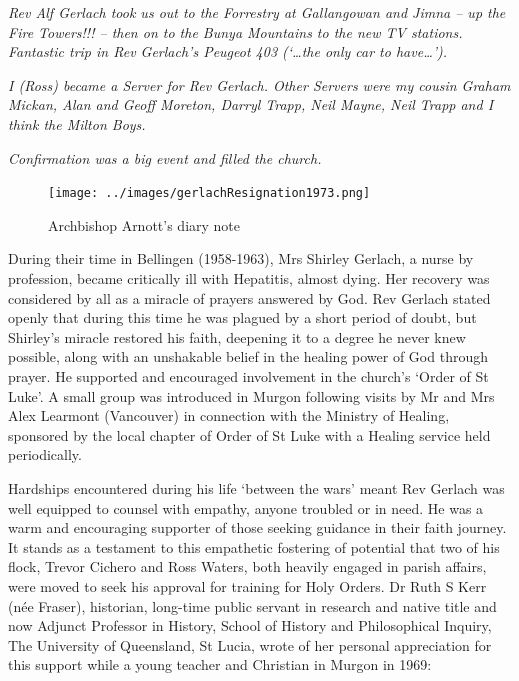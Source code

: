 \smallskip


\emph{Rev Alf Gerlach took us out to the Forrestry at Gallangowan and Jimna -- up the Fire Towers!!! -- then on to the Bunya Mountains to the new TV stations. Fantastic trip in Rev Gerlach's Peugeot 403 (`\ldots the only car to have\ldots').}



\smallskip


\emph{I (Ross) became a Server for Rev Gerlach. Other Servers were my cousin Graham Mickan, Alan and Geoff Moreton, Darryl Trapp, Neil Mayne, Neil Trapp and I think the Milton Boys.}



\smallskip


\emph{Confirmation was a big event and filled the church.}



\medskip








\begin{figure}[!htb]
\begin{center}
\texttt{[image: ../images/gerlachResignation1973.png]}
\caption{Archbishop Arnott's diary note}
\end{center}
\end{figure}




During their time in Bellingen (1958-1963), Mrs Shirley Gerlach, a nurse by profession, became critically ill with Hepatitis, almost dying. Her recovery was considered by all as a miracle of prayers answered by God. Rev Gerlach stated openly that during this time he was plagued by a short period of doubt, but Shirley's miracle restored his faith, deepening it to a degree he never knew possible, along with an unshakable belief in the healing power of God through prayer. He supported and encouraged involvement in the church's `Order of St Luke'. A small group was introduced in Murgon following visits by Mr and Mrs Alex Learmont (Vancouver) in connection with the Ministry of Healing, sponsored by the local chapter of Order of St Luke with a Healing service held periodically.



Hardships encountered during his life `between the wars' meant Rev Gerlach was well equipped to counsel with empathy, anyone troubled or in need. He was a warm and encouraging supporter of those seeking guidance in their faith journey. It stands as a testament to this empathetic fostering of potential that two of his flock, Trevor Cichero and Ross Waters, both heavily engaged in parish affairs, were moved to seek his approval for training for Holy Orders. Dr Ruth S Kerr (née Fraser), historian, long-time public servant in research and native title and now Adjunct Professor in History, School of History and Philosophical Inquiry, The University of Queensland, St Lucia, wrote of her personal appreciation for this support while a young teacher and Christian in Murgon in 1969:




